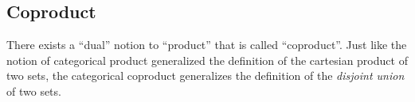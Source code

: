 
\subsection{Coproduct}
\label{sec:coproductset}

There exists a ``dual'' notion to ``product'' that is called ``coproduct''. Just like the notion of categorical product generalized the definition of the cartesian product of two sets, the categorical coproduct generalizes the definition of the \emph{disjoint union} of two sets.
%
%
%
\begin{comment}
Suppose that we are considering a hybrid car that contains two engines: an
electric engine and an internal combustion engine. Both can produce \transmuted{motion}, but each from a different source of energy. The electric engine uses \transmuted{electric energy}; the internal combustion engine uses \transmuted{gasoline}. The situation is as in \cref{fig:e16a}.

\begin{figure}[h!]
    \centering
    \includesag{30_dpcatfig_e14}
    \caption{Alternative ways to generate $\mathsf{motion}$. \label{fig:e16a}}
\end{figure}

From this we would like to conclude that we can obtain \textsf{motion} from \textbf{either} \textsf{gasoline} \textbf{or} \textsf{electric energy} (\cref{fig:e16b}).

\begin{figure}[h!]
    \centering
    \includesag{30_dpcatfig_e15}
    \caption{We can generate $\mathsf{motion}$ from either $\mathsf{gasoline}$ or $\mathsf{electric} \ \mathsf{energy}$. \label{fig:e16b}}
\end{figure}

To define the idea of ``\textbf{either} \transmuted{food} \textbf{or} \transmuted{drink}'' we can refer to the idea of disjoint union of sets (\cref{def:disjoint-union}).
\end{comment}

